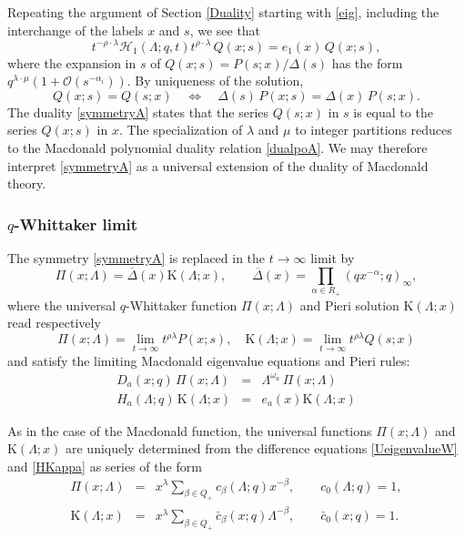 \documentclass[12pt]{amsart}
\numberwithin{equation}{section}
\begin{document}
Repeating the argument of Section \ref{Duality} starting with \eqref{eig}, including the interchange of the labels $x$ and $s$,
we see that
$$t^{-\rho\cdot \lambda}\mathcal H_1(\Lambda;q,t)t^{\rho\cdot \lambda}\, Q(x;s)=e_1(x)\, Q(x;s) ,$$
where the expansion in $s$ of $Q(x;s)=P(s;x)/\Delta(s)$ has the form $q^{\lambda\cdot \mu}(1+\mathcal{O} (s^{-\alpha_i}))$. By uniqueness of the solution, 
\begin{equation}\label{symmetryA}
Q(x;s)=Q(s;x)\quad \Leftrightarrow \quad \Delta(s)\,P(x;s)=\Delta(x)\,P(s;x).
\end{equation}
The duality \eqref{symmetryA} states that the series $Q(s;x)$ in $s$ is equal to the series $Q(x;s)$ in $x$. The specialization of $\lambda$ and $\mu$ to integer partitions reduces to the Macdonald polynomial duality relation \eqref{dualpoA}. We may therefore interpret \eqref{symmetryA} as a universal extension of the duality of Macdonald theory.


\subsubsection{$q$-Whittaker limit}


The symmetry \eqref{symmetryA} is replaced in the $t\to\infty$ limit by 
\begin{equation}\label{limitofsymmetry}
\Pi(x;\Lambda) = \overline{\Delta}(x) \mathrm{K}(\Lambda;x),\qquad \overline{\Delta}(x)=\prod_{\alpha\in R_+} (q x^{-\alpha};q)_\infty,
\end{equation}
where the universal $q$-Whittaker function $\Pi(x;\Lambda)$ and Pieri solution $\mathrm{K}(\Lambda;x)$ read respectively
$$
\Pi(x;\Lambda)=\lim_{t\to\infty} t^{\rho \lambda} P(x;s), \quad \mathrm{K}(\Lambda;x) = \lim_{t\to\infty} t^{\rho \lambda} Q(s;x)
$$
and satisfy the limiting Macdonald eigenvalue equations and Pieri rules:
\begin{eqnarray}
D_a(x;q)\, \Pi(x;\Lambda)&=& \Lambda^{\omega_a}\, \Pi(x;\Lambda) \label{UeigenvalueW}\\
H_a(\Lambda;q) \, \mathrm{K}(\Lambda;x) &=& e_a(x)\mathrm{K}(\Lambda;x) \label{HKappa}
\end{eqnarray}

As in the case of the Macdonald function, the universal functions $\Pi(x;\Lambda)$ and $\mathrm{K}(\Lambda;x)$ are uniquely determined from the difference equations \eqref{UeigenvalueW} and \eqref{HKappa} as series of the form
\begin{eqnarray}
\Pi(x;\Lambda) &=& x^\lambda \sum_{\beta \in Q_+} {c}_\beta(\Lambda;q) x^{-\beta},\qquad {c}_0(\Lambda;q)=1,\label{piseries}\\
\mathrm{K}(\Lambda;x) &=& x^\lambda \sum_{\beta\in Q_+}\bar{c}_\beta(x;q) \Lambda^{-\beta},\qquad 
\bar{c}_0(x;q)=1.\label{kappaseries}
\end{eqnarray}
\end{document}
